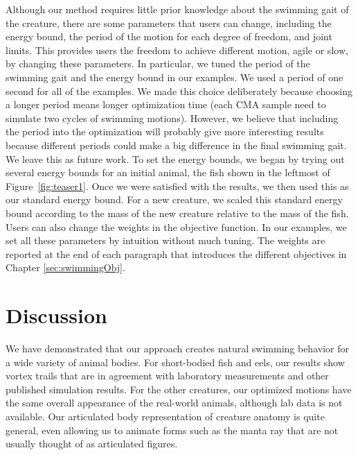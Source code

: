 Although our method requires little prior knowledge about the swimming gait of the creature,
there are some parameters that users can change, including the energy bound, the period of
the motion for each degree of freedom, and joint limits. This provides users the freedom to
achieve different motion, agile or slow, by changing these parameters. In particular, we tuned the period
of the swimming gait and the energy bound in our examples. We used a period of one second
for all of the examples. We made this choice deliberately because choosing a longer period means longer
optimization time (each CMA sample need to simulate two cycles of swimming motions). However, we believe
that including the period into the optimization will probably give more interesting results because different periods could make
a big difference in the final swimming gait. We leave this as future work. To set the energy bounds, we began by trying out several energy bounds
for an initial animal, the fish shown in the leftmost of Figure~\ref{fig:teaser1}.
Once we were satisfied with the results, we then used this as our standard energy bound.
For a new creature, we scaled this standard energy bound according to the mass of the new creature
relative to the mass of the fish. Users can also change the weights in the objective function.
In our examples, we set all these parameters by intuition without much tuning. The weights
are reported at the end of each paragraph that introduces the different objectives in Chapter \ref{sec:swimmingObj}.

\section{Discussion}

We have demonstrated that our approach creates natural swimming behavior for
a wide variety of animal bodies.  For short-bodied fish and eels, our
results show vortex trails that are in agreement with laboratory
measurements and other published simulation results.  For the other
creatures, our optimized motions have the same overall appearance of the
real-world animals, although lab data is not available.  Our articulated
body representation of creature anatomy is quite general, even allowing us to
animate forms such as the manta ray that are not usually thought of as
articulated figures.

